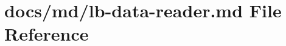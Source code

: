 \hypertarget{lb-data-reader_8md}{}\section{docs/md/lb-\/data-\/reader.md File Reference}
\label{lb-data-reader_8md}
